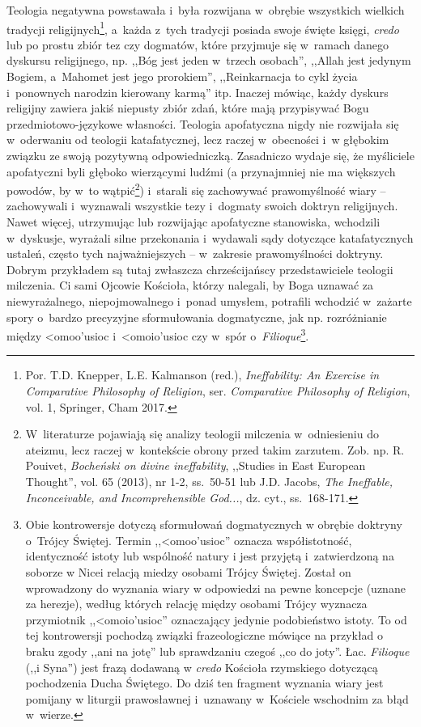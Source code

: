 Teologia negatywna powstawała i~była rozwijana w~obrębie wszystkich wielkich tradycji religijnych\footnote{Por. T.D. Knepper, L.E. Kalmanson (red.), \textit{Ineffability: An Exercise in Comparative Philosophy of Religion}, ser. \textit{Comparative Philosophy of Religion}, vol. 1, Springer, Cham 2017.}, a~każda z~tych tradycji posiada swoje święte księgi, \textit{credo} lub po prostu zbiór tez czy dogmatów, które przyjmuje się w~ramach danego dyskursu religijnego, np. ,,Bóg jest jeden w~trzech osobach'', ,,Allah jest jedynym Bogiem, a~Mahomet jest jego prorokiem'', ,,Reinkarnacja to cykl życia i~ponownych narodzin kierowany karmą'' itp. Inaczej mówiąc, każdy dyskurs religijny zawiera jakiś niepusty zbiór zdań, które mają przypisywać Bogu
przedmiotowo-językowe
własności. Teologia apofatyczna nigdy nie rozwijała się w~oderwaniu od teologii katafatycznej, lecz raczej w~obecności i~w głębokim związku ze swoją pozytywną odpowiedniczką. Zasadniczo wydaje się, że myśliciele apofatyczni byli głęboko wierzącymi ludźmi (a przynajmniej nie ma większych powodów, by w~to wątpić\footnote{W~literaturze pojawiają się analizy teologii milczenia w~odniesieniu do ateizmu, lecz raczej w~kontekście obrony przed takim zarzutem. Zob. np. R. Pouivet, \textit{Bocheński on divine ineffability}, ,,Studies in East European Thought'', vol. 65 (2013), nr 1-2, ss.~50-51 lub J.D. Jacobs, \textit{The Ineffable, Inconceivable, and Incomprehensible God...}, dz. cyt., ss.~168-171.}) i~starali się zachowywać prawomyślność wiary -- zachowywali i~wyznawali wszystkie tezy i~dogmaty swoich doktryn religijnych. Nawet więcej, utrzymując lub rozwijając apofatyczne stanowiska, wchodzili w~dyskusje, wyrażali silne przekonania i~wydawali sądy dotyczące katafatycznych ustaleń, często tych najważniejszych -- w~zakresie prawomyślności doktryny. Dobrym przykładem są tutaj zwłaszcza chrześcijańscy przedstawiciele teologii milczenia. Ci sami Ojcowie Kościoła, którzy nalegali, by Boga uznawać za niewyrażalnego, niepojmowalnego i~ponad umysłem, potrafili wchodzić w~zażarte spory o~bardzo precyzyjne sformułowania dogmatyczne, jak np. rozróżnianie między
\textgreek{<omoo'usioc}
i~\textgreek{<omoio'usioc}
czy w~spór o~\textit{Filioque}\footnote{Obie kontrowersje dotyczą sformułowań dogmatycznych w obrębie doktryny o~Trójcy Świętej. Termin ,,\textgreek{<omoo'usioc}'' oznacza współistotność, identyczność istoty lub wspólność natury i jest przyjętą i~zatwierdzoną na soborze w Nicei relacją miedzy osobami Trójcy Świętej. Został on wprowadzony do wyznania wiary w odpowiedzi na pewne koncepcje (uznane za herezje), według których relację między osobami Trójcy wyznacza przymiotnik ,,\textgreek{<omoio'usioc}'' oznaczający jedynie podobieństwo istoty. To od tej kontrowersji pochodzą związki frazeologiczne mówiące na przykład o braku zgody ,,ani na jotę'' lub sprawdzaniu czegoś ,,co do joty''. Łac. \textit{Filioque} (,,i Syna'') jest frazą dodawaną w \textit{credo} Kościoła rzymskiego dotyczącą pochodzenia Ducha Świętego. Do dziś ten fragment wyznania wiary jest pomijany w liturgii prawosławnej i~uznawany w~Kościele wschodnim za błąd w~wierze.}.

